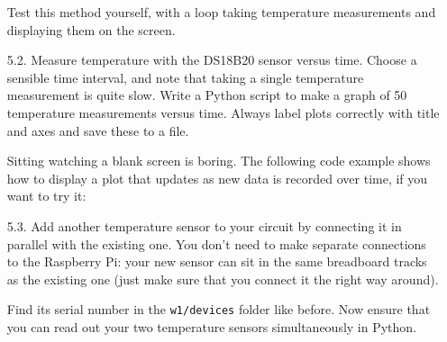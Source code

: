 \begin{enumerate}
Test this method yourself, with a loop taking temperature measurements and displaying them on the screen.



\item[5.2.] Measure temperature with the DS18B20 sensor versus time.
Choose a sensible time interval, and note that taking a single temperature measurement is quite slow.
Write a Python script to make a graph of 50 temperature measurements versus time.
Always label plots correctly with title and axes and save these to a file.
 

Sitting watching a blank screen is boring.
The following code example shows how to display a plot that updates as new data is recorded over time, if you want to try it:




\item[5.3.]	Add another temperature sensor to your circuit by connecting it in parallel with the existing one. 
You don't need to make separate connections to the Raspberry Pi: your new sensor can sit in the same breadboard tracks as the existing one (just make sure that you connect it the right way around).

Find its serial number in the \texttt{w1/devices} folder like before.
Now ensure that you can read out your two temperature sensors simultaneously in Python.

%
%
%
%


\end{enumerate}

